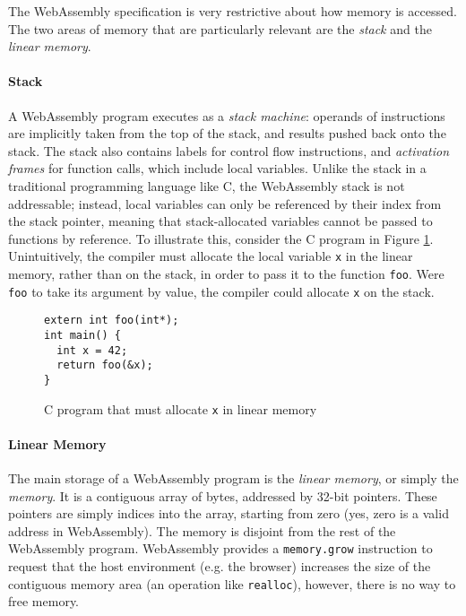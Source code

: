 The WebAssembly specification \cite{rossbergWebAssemblyCoreSpecification2022} is very restrictive about how memory is accessed. The two areas of memory that are particularly relevant are the \emph{stack} and the \emph{linear memory}.

\paragraph{Stack}

A WebAssembly program executes as a \emph{stack machine}: operands of instructions are implicitly taken from the top of the stack, and results pushed back onto the stack. The stack also contains labels for control flow instructions, and \emph{activation frames} for function calls, which include local variables. Unlike the stack in a traditional programming language like C, the WebAssembly stack is not addressable; instead, local variables can only be referenced by their index from the stack pointer, meaning that stack-allocated variables cannot be passed to functions by reference. To illustrate this, consider the C program in Figure \ref{fig:stack-c}. Unintuitively, the compiler must allocate the local variable \texttt{x} in the linear memory, rather than on the stack, in order to pass it to the function \texttt{foo}. Were \texttt{foo} to take its argument by value, the compiler could allocate \texttt{x} on the stack.

\begin{figure}[H]
\centering
\begin{verbatim}
extern int foo(int*);
int main() {
  int x = 42;
  return foo(&x);
}
\end{verbatim}
\caption{C program that must allocate \texttt{x} in linear memory}
\label{fig:stack-c}
\end{figure}

\paragraph{Linear Memory}

The main storage of a WebAssembly program is the \emph{linear memory}, or simply the \emph{memory}. It is a contiguous array of bytes, addressed by 32-bit pointers. These pointers are simply indices into the array, starting from zero (yes, zero is a valid address in WebAssembly). The memory is disjoint from the rest of the WebAssembly program. WebAssembly provides a \texttt{memory.grow} instruction to request that the host environment (e.g. the browser) increases the size of the contiguous memory area (an operation like \texttt{realloc}), however, there is no way to free memory.

